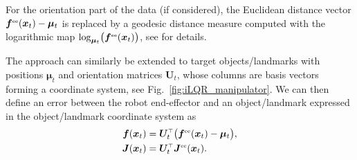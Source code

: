 \documentclass[10pt,a4paper]{article} %
\newcommand{\trsp}{{\scriptscriptstyle\top}}
\newcommand{\tp}[1]{\text{\tiny#1}}
\newcommand{\tmax}{{\scriptscriptstyle\max}}
\begin{document}
For the orientation part of the data (if considered), the Euclidean distance vector $\bm{f}^\tp{ee}(\bm{x}_t) - \bm{\mu}_t$ is replaced by a geodesic distance measure computed with the logarithmic map $\log_{\bm{\mu}_t}\!\big(\bm{f}^\tp{ee}(\bm{x}_t)\big)$, see \cite{Calinon20RAM} for details.

The approach can similarly be extended to target objects/landmarks with positions $\bm{\mu}_t$ and orientation matrices $\bm{U}_t$, whose columns are basis vectors forming a coordinate system, see Fig.~\ref{fig:iLQR_manipulator}. We can then define an error between the robot end-effector and an object/landmark expressed in the object/landmark coordinate system as 
\begin{equation}
\begin{aligned}
	\bm{f}(\bm{x}_t) &= \bm{U}_t^\trsp \big(\bm{f}^\tp{ee}(\bm{x}_t) - \bm{\mu}_t\big), \\
	\bm{J}(\bm{x}_t) &= \bm{U}_t^\trsp \bm{J}^\tp{ee}(\bm{x}_t). 
\end{aligned}
\label{eq:fJU}
\end{equation}




\end{document}
